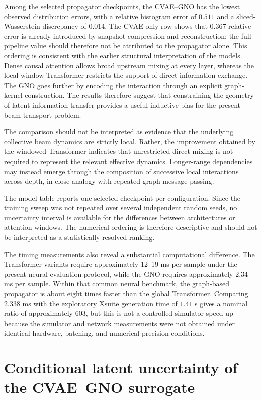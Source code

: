Among the selected propagator checkpoints, the CVAE–GNO has the lowest observed distribution errors, with a relative histogram error of \(0.511\) and a sliced-Wasserstein discrepancy of \(0.014 .\) The CVAE-only row shows that \(0.367\) relative error is already introduced by snapshot compression and reconstruction; the full-pipeline value should therefore not be attributed to the propagator alone. This ordering is consistent with the earlier structural interpretation of the models. Dense causal attention allows broad upstream mixing at every layer, whereas the local-window Transformer restricts the support of direct information exchange. The GNO goes further by encoding the interaction through an explicit graph-kernel construction. The results therefore suggest that constraining the geometry of latent information transfer provides a useful inductive bias for the present beam-transport problem.

The comparison should not be interpreted as evidence that the underlying collective beam dynamics are strictly local. Rather, the improvement obtained by the windowed Transformer indicates that unrestricted direct mixing is not required to represent the relevant effective dynamics. Longer-range dependencies may instead emerge through the composition of successive local interactions across depth, in close analogy with repeated graph message passing.

The model table reports one selected checkpoint per configuration. Since the training sweep was not repeated over several independent random seeds, no uncertainty interval is available for the differences between architectures or attention windows. The numerical ordering is therefore descriptive and should not be interpreted as a statistically resolved ranking.

The timing measurements also reveal a substantial computational difference. The Transformer variants require approximately 12–19 ms per sample under the present neural evaluation protocol, while the GNO requires approximately \(2.34\) ms per sample. Within that common neural benchmark, the graph-based propagator is about eight times faster than the global Transformer. Comparing \(2.338\) ms with the exploratory Xsuite generation time of \(1.41\) s gives a nominal ratio of approximately 603, but this is not a controlled simulator speed-up because the simulator and network measurements were not obtained under identical hardware, batching, and numerical-precision conditions.

\section{Conditional latent uncertainty of the CVAE–GNO surrogate}
\label{sec:05_results_conditional_latent_uncertainty_of_the_cvae_gno_surrogate}

